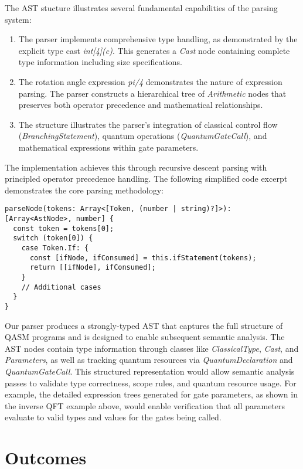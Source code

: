 \documentclass{article}
\begin{document}
The AST stucture illustrates several fundamental capabilities of the parsing system:
\begin{enumerate}
    \item The parser implements comprehensive type handling, as demonstrated by the explicit type cast \textit{int[4](c)}. This generates a \textit{Cast} node containing complete type information including size specifications.
    \item The rotation angle expression \textit{pi/4} demonstrates the nature of expression parsing. The parser constructs a hierarchical tree of \textit{Arithmetic} nodes that preserves both operator precedence and mathematical relationships.
    \item The structure illustrates the parser's integration of classical control flow (\textit{BranchingStatement}), quantum operations (\textit{QuantumGateCall}), and mathematical expressions within gate parameters.
\end{enumerate}

The implementation achieves this through recursive descent parsing with principled operator precedence handling. The following simplified code excerpt demonstrates the core parsing methodology:

\begin{lstlisting}
parseNode(tokens: Array<[Token, (number | string)?]>): [Array<AstNode>, number] {
  const token = tokens[0];
  switch (token[0]) {
    case Token.If: {
      const [ifNode, ifConsumed] = this.ifStatement(tokens);
      return [[ifNode], ifConsumed];
    }
    // Additional cases
  }
}
\end{lstlisting}

Our parser produces a strongly-typed AST that captures the full structure of QASM programs and is designed to enable subsequent semantic analysis. The AST nodes contain type information through classes like \textit{ClassicalType}, \textit{Cast}, and \textit{Parameters}, as well as tracking quantum resources via \textit{QuantumDeclaration} and \textit{QuantumGateCall}. This structured representation would allow semantic analysis passes to validate type correctness, scope rules, and quantum resource usage. For example, the detailed expression trees generated for gate parameters, as shown in the inverse QFT example above, would enable verification that all parameters evaluate to valid types and values for the gates being called.

\section{Outcomes}
\end{document}
